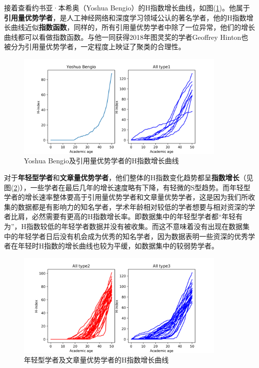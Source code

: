\documentclass[lang=cn,11pt,a4paper,cite=authoryear]{elegantpaper}
\begin{document}
接着查看约书亚·本希奥（Yoshua Bengio）的H指数增长曲线，如图(\ref{fig4})。他属于\textbf{引用量优势学者}，是人工神经网络和深度学习领域公认的著名学者，他的H指数增长曲线近似\textbf{指数函数}，同样的，所有引用量优势学者中除了一位异常，他们的增长曲线都可以看做指数函数。与他一同获得2018年图灵奖的学者Geoffrey Hinton也被分为引用量优势学者，一定程度上映证了聚类的合理性。

\begin{figure}[H]
	\centering
	\includegraphics[width=0.9\textwidth]{image/Yoshua Bengio.png}
	\caption{Yoshua Bengio及引用量优势学者的H指数增长曲线}
	\label{fig4}
\end{figure}

对于\textbf{年轻型学者}和\textbf{文章量优势学者}，他们整体的H指数变化趋势都呈\textbf{指数增长}（见图(\ref{fig5})），一些学者在最后几年的增长速度略有下降，有轻微的S型趋势。而年轻型学者的增长速率整体要高于引用量优势学者和文章量优势学者，这是因为我们所收集的数据都是有影响力的知名学者，学术年龄相对较低的学者想要与相对资深的学者比肩，必然需要有更高的H指数增长率。即数据集中的年轻型学者都“年轻有为”，H指数较低的年轻学者数据并没有被收集。而这不意味着没有出现在数据集中的年轻学者日后没有机会成为优秀的知名学者，因为数据表明一些资深的优秀学者在年轻时H指数的增长曲线也较为平缓，如数据集中的较弱势学者。

\begin{figure}[H]
	\centering
	\includegraphics[width=0.9\textwidth]{image/type2_3.png}
	\caption{年轻型学者及文章量优势学者的H指数增长曲线}
	\label{fig5}
\end{figure}
\end{document}
